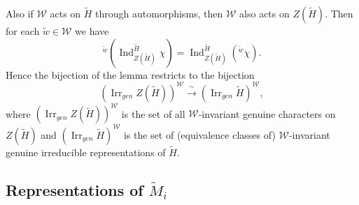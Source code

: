 \documentclass[10pt, letterpaper]{amsart}
\theoremstyle{plain}
\theoremstyle{definition}
\numberwithin{equation}{section}
\newcommand{\wt}{\tilde{w}}
\newcommand{\Mt}{\widetilde{M}}
\newcommand{\Ht}{\widetilde{H}}
\newcommand{\Ind}{\operatorname{Ind}}
\newcommand{\Irr}{\operatorname{Irr}}
\newcommand{\Wcal}{\mathcal{W}}
\begin{document}
Also if $\Wcal$ acts on $\Ht$ through automorphisms, then $\Wcal$ also acts on $Z(\Ht)$. Then for each $\wt\in\Wcal$ we have
\[
^{\wt}\left(\Ind_{Z(\Ht)}^{\Ht}\chi\right)=\Ind_{Z(\Ht)}^{\Ht}({^{\wt}\chi}).
\]
Hence the bijection of the lemma restricts to the bijection
\begin{equation}\label{E:bijection_Weyl_invariant_rep}
(\Irr_{gen}Z(\Ht))^{\Wcal}\xrightarrow{\;\sim\;}(\Irr_{gen}\Ht)^{\Wcal},
\end{equation}
where $(\Irr_{gen}Z(\Ht))^{\Wcal}$ is the set of all $\Wcal$-invariant genuine characters on $Z(\Ht)$ and $(\Irr_{gen}\Ht)^{\Wcal}$ is the set of (equivalence classes of) $\Wcal$-invariant genuine irreducible representations of $\Ht$.




\subsection{Representations of $\Mt_i$}

\end{document}
